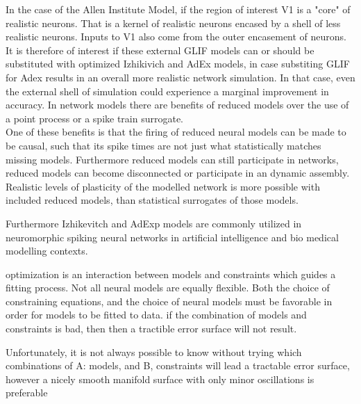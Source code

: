 In the case of the Allen Institute Model, if the region of interest V1 is a "core" of realistic neurons. That is a kernel of realistic neurons encased by a shell of less realistic neurons. Inputs to V1 also come from the outer encasement of neurons. It is therefore of interest if these external GLIF models can or should be substituted with optimized Izhikivich and AdEx models, in case substiting GLIF for Adex results in an overall more realistic network simulation. In that case, even the external shell of simulation could experience a marginal improvement in accuracy. In network models there are benefits of reduced models over the use of a point process or a spike train surrogate.\\


One of these benefits is that the firing of reduced neural models can be made to be causal, such that its spike times are not just what statistically matches missing models. Furthermore reduced models can still participate in networks, reduced models can become disconnected or participate in an dynamic assembly. Realistic levels of plasticity of the modelled network is more possible with included reduced models, than statistical surrogates of those models.

Furthermore Izhikevitch and AdExp models are commonly utilized in neuromorphic spiking neural networks in artificial intelligence and bio medical modelling contexts.

optimization is an interaction between models and constraints which guides a fitting process. Not all neural models are equally flexible.  
Both the choice of constraining equations, and the choice of neural models must be favorable in order for models to be fitted to data.
if the combination of models and constraints is bad, then then a tractible error surface will not result.  

Unfortunately, it is not always possible to know without trying which combinations of A: models, and B, constraints will lead a tractable error surface, however a nicely smooth manifold surface with only minor oscillations is preferable


